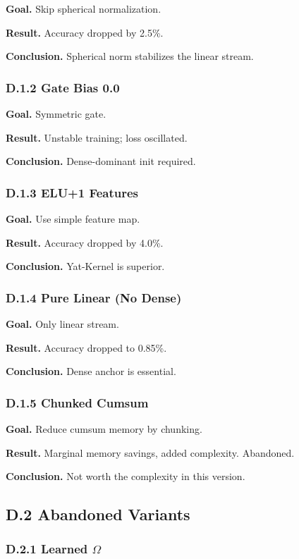 \textbf{Goal.} Skip spherical normalization.

\textbf{Result.} Accuracy dropped by 2.5\%.

\textbf{Conclusion.} Spherical norm stabilizes the linear stream.

\subsubsection{D.1.2 Gate Bias 0.0}

\textbf{Goal.} Symmetric gate.

\textbf{Result.} Unstable training; loss oscillated.

\textbf{Conclusion.} Dense-dominant init required.

\subsubsection{D.1.3 ELU+1 Features}

\textbf{Goal.} Use simple feature map.

\textbf{Result.} Accuracy dropped by 4.0\%.

\textbf{Conclusion.} Yat-Kernel is superior.

\subsubsection{D.1.4 Pure Linear (No Dense)}

\textbf{Goal.} Only linear stream.

\textbf{Result.} Accuracy dropped to 0.85\%.

\textbf{Conclusion.} Dense anchor is essential.

\subsubsection{D.1.5 Chunked Cumsum}

\textbf{Goal.} Reduce cumsum memory by chunking.

\textbf{Result.} Marginal memory savings, added complexity. Abandoned.

\textbf{Conclusion.} Not worth the complexity in this version.

\subsection{D.2 Abandoned Variants}

\subsubsection{D.2.1 Learned $\Omega$}

